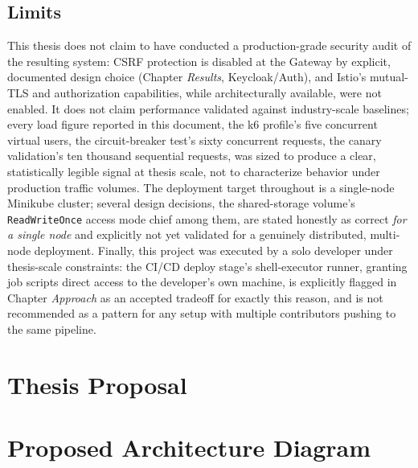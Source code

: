 \documentclass[twoside]{supsistudent}
\begin{document}
\section{Limits}
This thesis does not claim to have conducted a production-grade security audit of the resulting system: CSRF protection is disabled at the Gateway by explicit, documented design choice (Chapter \emph{Results}, Keycloak/Auth), and Istio's mutual-TLS and authorization capabilities, while architecturally available, were not enabled. It does not claim performance validated against industry-scale baselines; every load figure reported in this document, the k6 profile's five concurrent virtual users, the circuit-breaker test's sixty concurrent requests, the canary validation's ten thousand sequential requests, was sized to produce a clear, statistically legible signal at thesis scale, not to characterize behavior under production traffic volumes. The deployment target throughout is a single-node Minikube cluster; several design decisions, the shared-storage volume's \texttt{ReadWriteOnce} access mode chief among them, are stated honestly as correct \emph{for a single node} and explicitly not yet validated for a genuinely distributed, multi-node deployment. Finally, this project was executed by a solo developer under thesis-scale constraints: the CI/CD deploy stage's shell-executor runner, granting job scripts direct access to the developer's own machine, is explicitly flagged in Chapter \emph{Approach} as an accepted tradeoff for exactly this reason, and is not recommended as a pattern for any setup with multiple contributors pushing to the same pipeline.

\appendix

\chapter{Thesis Proposal}
\label{app:thesis-proposal}


\chapter{Proposed Architecture Diagram}
\label{app:proposed-architecture-diagram}




\end{document}
